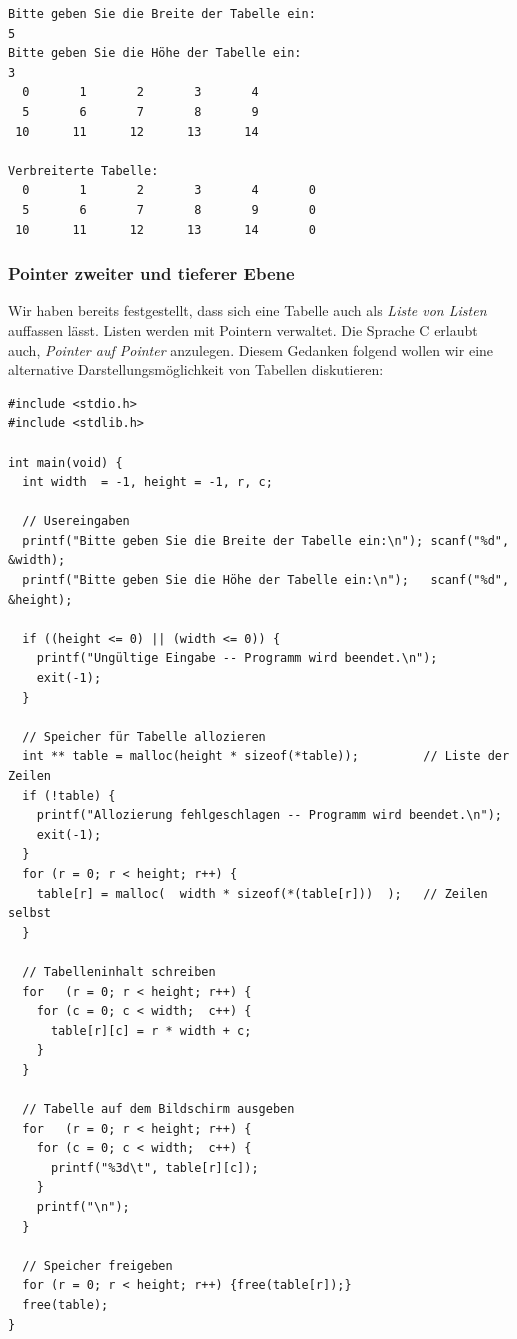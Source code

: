 \begin{cmdbox}
\begin{verbatim}
Bitte geben Sie die Breite der Tabelle ein:
5
Bitte geben Sie die Höhe der Tabelle ein:
3
  0       1       2       3       4
  5       6       7       8       9
 10      11      12      13      14

Verbreiterte Tabelle:
  0       1       2       3       4       0
  5       6       7       8       9       0
 10      11      12      13      14       0
\end{verbatim}
\end{cmdbox}

\subsubsection{Pointer zweiter und tieferer Ebene}
Wir haben bereits festgestellt, dass sich eine Tabelle auch als \emph{Liste von Listen} auffassen lässt. Listen werden mit Pointern verwaltet. Die Sprache C erlaubt auch, \emph{Pointer auf Pointer} anzulegen. Diesem Gedanken folgend wollen wir eine alternative Darstellungsmöglichkeit von Tabellen diskutieren:

\begin{codebox}
\begin{verbatim}
#include <stdio.h>
#include <stdlib.h>

int main(void) {
  int width  = -1, height = -1, r, c;

  // Usereingaben
  printf("Bitte geben Sie die Breite der Tabelle ein:\n"); scanf("%d", &width);
  printf("Bitte geben Sie die Höhe der Tabelle ein:\n");   scanf("%d", &height);

  if ((height <= 0) || (width <= 0)) {
    printf("Ungültige Eingabe -- Programm wird beendet.\n");
    exit(-1);
  }

  // Speicher für Tabelle allozieren
  int ** table = malloc(height * sizeof(*table));         // Liste der Zeilen
  if (!table) {
    printf("Allozierung fehlgeschlagen -- Programm wird beendet.\n");
    exit(-1);
  }
  for (r = 0; r < height; r++) {
    table[r] = malloc(  width * sizeof(*(table[r]))  );   // Zeilen selbst
  }

  // Tabelleninhalt schreiben
  for   (r = 0; r < height; r++) {
    for (c = 0; c < width;  c++) {
      table[r][c] = r * width + c;
    }
  }

  // Tabelle auf dem Bildschirm ausgeben
  for   (r = 0; r < height; r++) {
    for (c = 0; c < width;  c++) {
      printf("%3d\t", table[r][c]);
    }
    printf("\n");
  }

  // Speicher freigeben
  for (r = 0; r < height; r++) {free(table[r]);}
  free(table);
}
\end{verbatim}
\end{codebox}

